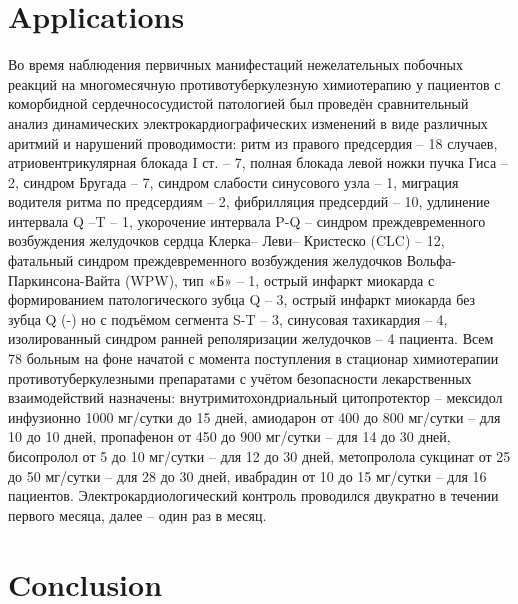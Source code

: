 \documentclass[runningheads]{AIIT}
\begin{document}
\section{Applications}
\label{sec:applications}

 Во время  наблюдения  первичных манифестаций нежелательных побочных реакций на многомесячную противотуберкулезную химиотерапию у пациентов с коморбидной сердечнососудистой патологией был проведён сравнительный анализ динамических электрокардиографических изменений в виде различных аритмий и нарушений проводимости: ритм из правого предсердия – 18 случаев, атриовентрикулярная блокада I ст. – 7, полная блокада левой ножки пучка Гиса – 2, синдром Бругада – 7, синдром слабости синусового узла – 1, миграция водителя ритма по предсердиям – 2, фибрилляция предсердий – 10, удлинение интервала Q –T – 1, укорочение интервала P-Q – синдром  преждевременного возбуждения желудочков сердца Клерка– Леви– Кристеско (CLC) – 12, фатальный синдром  преждевременного возбуждения желудочков  Вольфа-Паркинсона-Вайта (WPW), тип «Б» – 1, острый инфаркт миокарда с формированием патологического зубца Q – 3, острый инфаркт миокарда без зубца Q (-) но с подъёмом сегмента S-T – 3, синусовая тахикардия – 4, изолированный синдром ранней реполяризации желудочков  – 4 пациента.
Всем 78 больным на фоне начатой с момента поступления в стационар химиотерапии противотуберкулезными препаратами с учётом безопасности лекарственных взаимодействий назначены: внутримитохондриальный цитопротектор – мексидол инфузионно 1000 мг/сутки до 15 дней, амиодарон от 400 до 800 мг/сутки – для 10 до 10 дней, пропафенон от 450 до 900 мг/сутки – для 14 до 30 дней, бисопролол от 5 до 10 мг/сутки – для 12 до 30 дней, метопролола сукцинат от 25 до 50 мг/сутки  – для 28 до 30 дней, ивабрадин от 10 до 15 мг/сутки – для 16 пациентов. Электрокардиологический контроль проводился двукратно в течении первого месяца, далее – один раз в месяц.

\section*{Conclusion}
\end{document}
